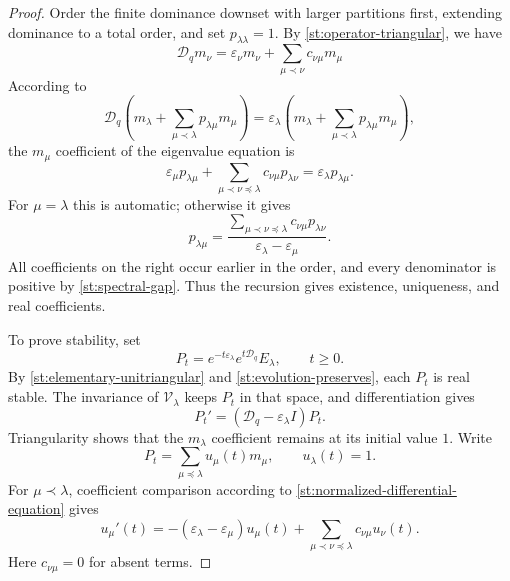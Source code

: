 \documentclass[reqno, 12pt]{article}
\numberwithin{equation}{section}
\theoremstyle{definition}
\begin{document}
\begin{proof}
Order the finite dominance downset with larger partitions first,
extending dominance to a total order, and set
$p_{\lambda\lambda}=1$.
By \cref{st:operator-triangular}, we have
$$\mathcal D_q m_\nu=\varepsilon_\nu m_\nu+\sum_{\mu\prec\nu}c_{\nu\mu}m_\mu$$
According to
$$\mathcal D_q\left(m_\lambda+\sum_{\mu\prec\lambda}p_{\lambda\mu}m_\mu\right)=\varepsilon_\lambda \left(m_\lambda+\sum_{\mu\prec\lambda}p_{\lambda\mu}m_\mu\right),$$
the $m_\mu$ coefficient of the eigenvalue equation is
\[\varepsilon_\mu p_{\lambda\mu}+\sum_{\mu\prec\nu\preceq\lambda}c_{\nu\mu}p_{\lambda\nu}=\varepsilon_\lambda p_{\lambda\mu}.
\]
For $\mu=\lambda$ this is automatic; otherwise it gives
\begin{equation}\label{st:eigenfunction-recursion}
p_{\lambda\mu}
=\frac{\displaystyle\sum_{\mu\prec\nu\preceq\lambda}
        c_{\nu\mu}p_{\lambda\nu}}
       {\varepsilon_\lambda-\varepsilon_\mu}.
\end{equation}
All coefficients on the right occur earlier in the order, and every
denominator is positive by \cref{st:spectral-gap}.
Thus the recursion gives existence, uniqueness, and real coefficients.

To prove stability, set
\begin{equation}\label{st:normalized-evolution}
P_t=e^{-t\varepsilon_\lambda}
       e^{t\mathcal D_q}E_\lambda,
\qquad t\geq0.
\end{equation}
By \cref{st:elementary-unitriangular} and \cref{st:evolution-preserves}, each $P_t$ is real stable.
The invariance of $\mathcal V_\lambda$ keeps $P_t$ in that space,
and differentiation gives
\begin{equation}\label{st:normalized-differential-equation}
P_t'=(\mathcal D_q-\varepsilon_\lambda I)P_t.
\end{equation}
Triangularity shows that the $m_\lambda$ coefficient remains
at its initial value $1$.  Write
\[
P_t=\sum_{\mu\preceq\lambda}u_\mu(t)m_\mu,
\qquad u_\lambda(t)=1.
\]
For $\mu\prec\lambda$, coefficient comparison according to \eqref{st:normalized-differential-equation} gives
\begin{equation}\label{st:coefficient-evolution}
u_\mu'(t)
=-(\varepsilon_\lambda-\varepsilon_\mu)u_\mu(t)
  +\sum_{\mu\prec\nu\preceq\lambda}
      c_{\nu\mu}u_\nu(t).
\end{equation}
Here $c_{\nu\mu}=0$ for absent terms.


\end{proof}
\end{document}
